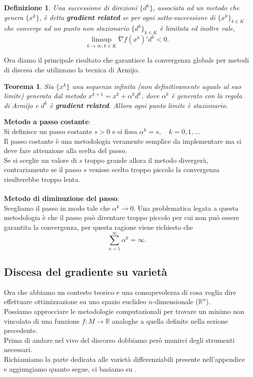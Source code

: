 \documentclass[a4paper, 12pt]{article}
\newtheorem{theorem}{Teorema}
\newtheorem{definition}{Definizione}
\begin{document}
\begin{definition}
Una successione di direzioni $\{d^k\}$, associata ad un metodo che genera $\{x^k\}$, è detta \textbf{gradient related} se per ogni sotto-successione di $\{x^k\}_{k \in K}$ che converge ad un punto non stazionario $\{d^k\}_{k \in K}$ è limitata ed inoltre vale,\\
\[\limsup\limits_{k \to \infty, k \in K} \nabla f(x^k)'d^k < 0.\]
\end{definition}
Ora diamo il principale risultato che garantisce la convergenza globale per metodi di discesa che utilizzano la tecnica di Armijo.
\begin{theorem}
Sia $\{x^k\}$ una sequenza infinita (non definitivamente uguale al suo limite) generata dal metodo $x^{k+1} = x^k + \alpha^k d^k$, dove $\alpha^k$ è generato con la regola di Armijo e $d^k$ è \textbf{gradient related}. Allora ogni punto limite è stazionario.
\end{theorem}
\textbf{Metodo a passo costante}:\\
Si definisce un passo costante $s > 0$ e si fissa $\alpha^k = s, \quad k = 0,1, ...$\\
Il passo costante è una metodologia veramente semplice da implementare ma si deve fare attenzione alla scelta del passo.\\
Se si sceglie un valore di $s$ troppo grande allora il metodo divergerà, contrariamente se il passo $s$ venisse scelto troppo piccolo la convergenza risulterebbe troppo lenta.\\\\
\textbf{Metodo di diminuzione del passo}:\\
Scegliamo il passo in modo tale che $\alpha^k \rightarrow 0$. Una problematica legata a questa metodologia è che il passo può diventare troppo piccolo per cui non può essere garantita la convergenza, per questa ragione viene richiesto che\\ \[\sum_{n=1}^{\infty} \alpha^k = \infty.\]
\subsection{Discesa del gradiente su varietà} \label{riemanniangd}
Ora che abbiamo un contesto teorico e una consapevolezza di cosa voglia dire effettuare ottimizzazione su uno spazio euclideo $n$-dimensionale ($\mathbb{R}^n$).\\
Possiamo approcciare le metodologie computazionali per trovare un minimo non vincolato di una funzione $f:M \to \mathbb{R}$ analoghe a quella definite nella sezione precedente.\\
Prima di andare nel vivo del discorso dobbiamo però munirci degli strumenti necessari.\\
Richiamiamo la parte dedicata alle varietà differenziabili presente nell'appendice e aggiungiamo quanto segue, ci basiamo su \cite{Absil}.
\end{document}
